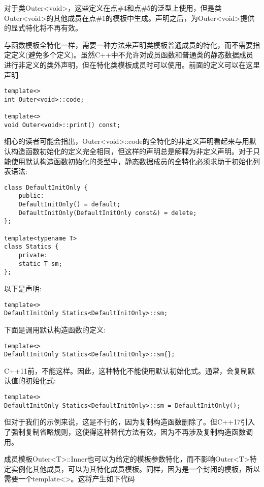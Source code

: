 对于类Outer<void>，这些定义在点\#4和点\#5的泛型上使用，但是类Outer<void>的其他成员在点\#1的模板中生成。声明之后，为Outer<void>提供的显式特化将不再有效。

与函数模板全特化一样，需要一种方法来声明类模板普通成员的特化，而不需要指定定义(避免多个定义)。虽然C++中不允许对成员函数和普通类的静态数据成员进行非定义的类外声明，但在特化类模板成员时可以使用。前面的定义可以在这里声明

\begin{lstlisting}[style=styleCXX]
template<>
int Outer<void>::code;

template<>
void Outer<void>::print() const;
\end{lstlisting}

细心的读者可能会指出，Outer<void>::code的全特化的非定义声明看起来与用默认构造函数初始化的定义完全相同，但这样的声明总是解释为非定义声明。对于只能使用默认构造函数初始化的类型中，静态数据成员的全特化必须求助于初始化列表语法:

\begin{lstlisting}[style=styleCXX]
class DefaultInitOnly {
	public:
	DefaultInitOnly() = default;
	DefaultInitOnly(DefaultInitOnly const&) = delete;
};

template<typename T>
class Statics {
	private:
	static T sm;
};
\end{lstlisting}

以下是声明:

\begin{lstlisting}[style=styleCXX]
template<>
DefaultInitOnly Statics<DefaultInitOnly>::sm;
\end{lstlisting}

下面是调用默认构造函数的定义:

\begin{lstlisting}[style=styleCXX]
template<>
DefaultInitOnly Statics<DefaultInitOnly>::sm{};
\end{lstlisting}

C++11前，不能这样。因此，这种特化不能使用默认初始化式。通常，会复制默认值的初始化式:

\begin{lstlisting}[style=styleCXX]
template<>
DefaultInitOnly Statics<DefaultInitOnly>::sm = DefaultInitOnly();
\end{lstlisting}

但对于我们的示例来说，这是不行的，因为复制构造函数删除了。但C++17引入了强制复制省略规则，这使得这种替代方法有效，因为不再涉及复制构造函数调用。

成员模板Outer<T>::Inner也可以为给定的模板参数特化，而不影响Outer<T>特定实例化其他成员，可以为其特化成员模板。同样，因为是一个封闭的模板，所以需要一个template<>。这将产生如下代码

